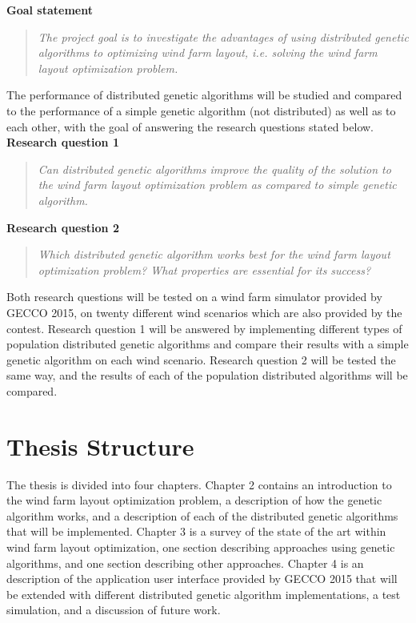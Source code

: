 \noindent \textbf{Goal statement}

\begin{quote}
\textit{The project goal is to investigate the advantages of using distributed genetic algorithms to optimizing wind farm layout, i.e. solving the wind farm layout optimization problem.} \citep{Samorani}
\end{quote}

\noindent The performance of distributed genetic algorithms will be studied and compared to the performance of a simple genetic algorithm (not distributed) as well as to each other, with the goal of answering the research questions stated below.\\

\noindent \textbf{Research question 1}

\begin{quote}
\textit{Can distributed genetic algorithms improve the quality of the solution to the wind farm layout optimization problem as compared to simple genetic algorithm.}
\end{quote}

\noindent \textbf{Research question 2}

\begin{quote}
\textit{Which distributed genetic algorithm works best for the wind farm layout optimization problem? What properties are essential for its success?}
\end{quote}

\noindent Both research questions will be tested on a wind farm simulator provided by GECCO 2015, on twenty different wind scenarios which are also provided by the contest. Research question 1 will be answered by implementing different types of population distributed genetic algorithms and compare their results with a simple genetic algorithm on each wind scenario. Research question 2 will be tested the same way, and the results of each of the population distributed algorithms will be compared.


\section{Thesis Structure}\label{thesisstructure}
The thesis is divided into four chapters. Chapter 2 contains an introduction to the wind farm layout optimization problem, a description of how the genetic algorithm works, and a description of each of the distributed genetic algorithms that will be implemented. Chapter 3 is a survey of the state of the art within wind farm layout optimization, one section describing approaches using genetic algorithms, and one section describing other approaches. Chapter 4 is an description of the application user interface provided by GECCO 2015 that will be extended with different distributed genetic algorithm implementations, a test simulation, and a discussion of future work. 